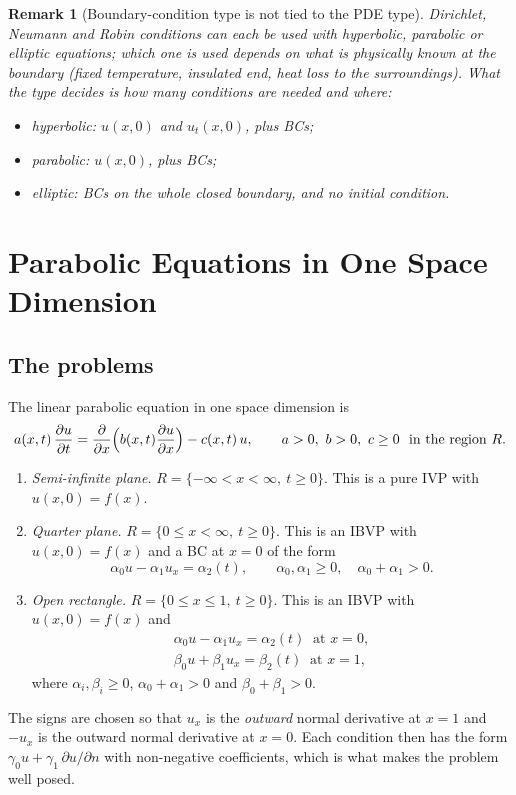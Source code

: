 \documentclass[11pt,a4paper]{article}
\numberwithin{equation}{section}
\theoremstyle{spacedplain}
\theoremstyle{spaceddefinition}
\theoremstyle{spacedremark}
\newtheorem{remark}[theorem]{Remark}
\newcommand{\pd}[2]{\frac{\partial #1}{\partial #2}}
\begin{document}
\begin{remark}[Boundary-condition type is not tied to the PDE type]
Dirichlet, Neumann and Robin conditions can each be used with
hyperbolic, parabolic or elliptic equations; which one is used depends
on what is physically known at the boundary (fixed temperature,
insulated end, heat loss to the surroundings).  What the \emph{type}
decides is how many conditions are needed and where:
\begin{itemize}
  \item hyperbolic: \(u(x,0)\) and \(u_t(x,0)\), plus BCs;
  \item parabolic: \(u(x,0)\), plus BCs;
  \item elliptic: BCs on the whole closed boundary, and no initial
    condition.
\end{itemize}
\end{remark}

\section{Parabolic Equations in One Space Dimension}

\subsection{The problems}

The linear parabolic equation in one space dimension is
\begin{equation}\label{eq:par}
  a(x,t)\,\pd ut=\pd{}{x}\Bigl(b(x,t)\pd ux\Bigr)-c(x,t)\,u,
  \qquad a>0,\ b>0,\ c\ge0\ \text{ in the region } R.
\end{equation}
\begin{enumerate}[label=(\roman*)]
  \item \emph{Semi-infinite plane.}
    \(R=\{-\infty<x<\infty,\ t\ge0\}\).  This is a pure IVP with
    \(u(x,0)=f(x)\).
  \item \emph{Quarter plane.} \(R=\{0\le x<\infty,\ t\ge0\}\).  This is
    an IBVP with \(u(x,0)=f(x)\) and a BC at \(x=0\) of the form
    \[
      \alpha_0u-\alpha_1u_x=\alpha_2(t),
      \qquad \alpha_0,\alpha_1\ge0,\quad \alpha_0+\alpha_1>0.
    \]
  \item \emph{Open rectangle.} \(R=\{0\le x\le1,\ t\ge0\}\).  This is an
    IBVP with \(u(x,0)=f(x)\) and
    \[
\begin{gathered}
      \alpha_0u-\alpha_1u_x=\alpha_2(t)\ \text{ at } x=0,
  \\
      \beta_0u+\beta_1u_x=\beta_2(t)\ \text{ at } x=1,
    \end{gathered}
\]
    where \(\alpha_i,\beta_i\ge0\), \(\alpha_0+\alpha_1>0\) and
    \(\beta_0+\beta_1>0\).
\end{enumerate}
The signs are chosen so that \(u_x\) is the \emph{outward} normal
derivative at \(x=1\) and \(-u_x\) is the outward normal derivative at
\(x=0\).  Each condition then has the form
\(\gamma_0u+\gamma_1\,\partial u/\partial n\) with non-negative
coefficients, which is what makes the problem well posed.
\end{document}
